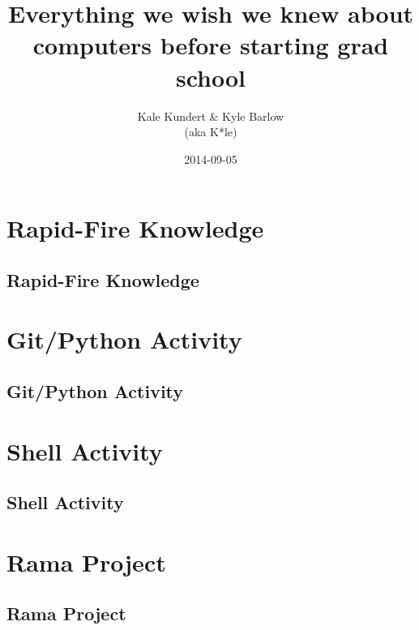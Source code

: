 \documentclass[xcolor=x11names,compress,aspectratio=43]{beamer}
\title[Bootcamp Hacking] %
{Everything we wish we knew about computers before starting grad school}
\author[] %
{Kale Kundert \& Kyle Barlow \\ (aka K*le)}
\date[] %
{2014-09-05}
\renewcommand{\(}{\begin{columns}}
\renewcommand{\)}{\end{columns}}
\newcommand{\<}[1]{\begin{column}{#1}}
\renewcommand{\>}{\end{column}}
\begin{document}


\contourlength{2pt} %

\begin{frame}
 \titlepage
\end{frame}


\section{Rapid-Fire Knowledge}
\subsection{Rapid-Fire Knowledge}











\section{Git/Python Activity}
\subsection{Git/Python Activity}






\section{Shell Activity}
\subsection{Shell Activity}



\section{Rama Project}
\subsection{Rama Project}


\end{document}
